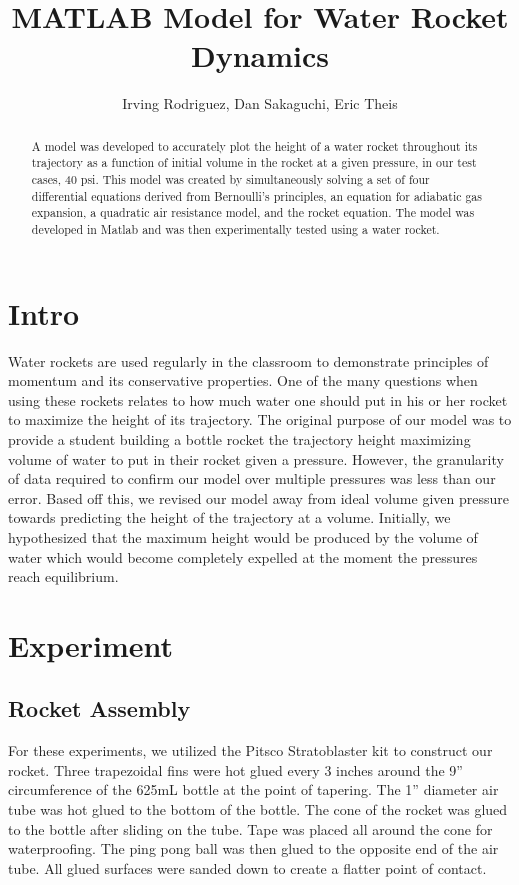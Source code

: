 \documentclass[12pt]{article}
\title{MATLAB Model for Water Rocket Dynamics}
\author{Irving Rodriguez, Dan Sakaguchi, Eric Theis}
\date{}
\begin{document}
\begin{titlepage}
  \maketitle 
    \begin{abstract}
  A model was developed to accurately plot the height of a water rocket throughout its trajectory as a function of initial volume in the rocket at a given pressure, in our test cases, 40 psi. This model was created by simultaneously solving a set of four differential equations derived from Bernoulli's principles, an equation for adiabatic gas expansion, a quadratic air resistance model, and the rocket equation. The model was developed in Matlab and was then experimentally tested using a water rocket.
  \end{abstract}
\end{titlepage}
  \tableofcontents
  \pagebreak

  \section{Intro}
  Water rockets are used regularly in the classroom to demonstrate principles of momentum and its conservative properties. One of the many questions when using these rockets relates to how much water one should put in his or her rocket to maximize the height of its trajectory. The original purpose of our model was to provide a student building a bottle rocket the trajectory height maximizing volume of water to put in their rocket given a pressure. However, the granularity of data required to confirm our model over multiple pressures was less than our error. Based off this, we revised our model away from ideal volume given pressure towards predicting the height of the trajectory at a volume.
Initially, we hypothesized that the maximum height would be produced by the volume of water which would become completely expelled at the moment the pressures reach equilibrium.
  \section{Experiment}
  \subsection{Rocket Assembly}
For these experiments, we utilized the Pitsco Stratoblaster kit to construct our rocket. Three trapezoidal fins were hot glued every 3 inches around the 9” circumference of the 625mL bottle at the point of tapering. The 1” diameter air tube was hot glued to the bottom of the bottle. The cone of the rocket was glued to the bottle after sliding on the tube. Tape was placed all around the cone for waterproofing. The ping pong ball was then glued to the opposite end of the air tube. All glued surfaces were sanded down to create a flatter point of contact. 
\end{document}
